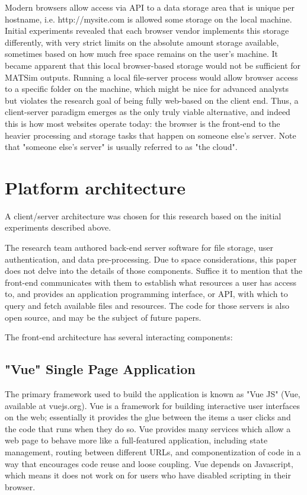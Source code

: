 \documentclass[Afour,sageh,times]{sagej}
\begin{document}
Modern browsers allow access via API to a data storage area that is unique per hostname, i.e. http://mysite.com is allowed some storage on the local machine. Initial experiments revealed that each browser vendor implements this storage differently, with very strict limits on the absolute amount storage available, sometimes based on how much free space remains on the user's machine. It became apparent that this local browser-based storage would not be sufficient for MATSim outputs. Running a local file-server process would allow browser access to a specific folder on the machine, which might be nice for advanced analysts but violates the research goal of being fully web-based on the client end. Thus, a client-server paradigm emerges as the only truly viable alternative, and indeed this is how most websites operate today: the browser is the front-end to the heavier processing and storage tasks that happen on someone else's server. Note that "someone else's server" is usually referred to as "the cloud".

\section{Platform architecture}

A client/server architecture was chosen for this research based on the initial experiments described above.

The research team authored back-end server software for file storage, user authentication, and data pre-processing. Due to space considerations, this paper does not delve into the details of those components. Suffice it to mention that the front-end communicates with them to establish what resources a user has access to, and provides an application programming interface, or API, with which to query and fetch available files and resources. The code for those servers is also open source, and may be the subject of future papers.

The front-end architecture has several interacting components:

\subsection{"Vue" Single Page Application}

The primary framework used to build the application is known as "Vue JS" (Vue, available at vuejs.org). Vue is a framework for building interactive user interfaces on the web; essentially it provides the glue between the items a user clicks and the code that runs when they do so. Vue provides many services which allow a web page to behave more like a full-featured application, including state management, routing between different URLs, and componentization of code in a way that encourages code reuse and loose coupling. Vue depends on Javascript, which means it does not work on for users who have disabled scripting in their browser.
\end{document}

